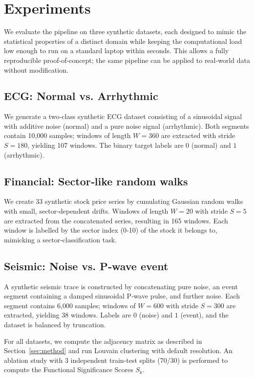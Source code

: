 \section{Experiments}\label{sec:experiments}
We evaluate the pipeline on three synthetic datasets, each designed to mimic the statistical properties of a distinct domain while keeping the computational load low enough to run on a standard laptop within seconds.
This allows a fully reproducible proof‑of‑concept; the same pipeline can be applied to real‑world data without modification.

\subsection{ECG: Normal vs. Arrhythmic}
We generate a two‑class synthetic ECG dataset consisting of a sinusoidal signal with additive noise (normal) and a pure noise signal (arrhythmic).
Both segments contain 10,000 samples; windows of length $W=360$ are extracted with stride $S=180$, yielding 107 windows.
The binary target labels are $0$ (normal) and $1$ (arrhythmic).

\subsection{Financial: Sector‑like random walks}
We create 33 synthetic stock price series by cumulating Gaussian random walks with small, sector‑dependent drifts.
Windows of length $W=20$ with stride $S=5$ are extracted from the concatenated series, resulting in 165 windows.
Each window is labelled by the sector index (0‑10) of the stock it belongs to, mimicking a sector‑classification task.

\subsection{Seismic: Noise vs. P‑wave event}
A synthetic seismic trace is constructed by concatenating pure noise, an event segment containing a damped sinusoidal P‑wave pulse, and further noise.
Each segment contains 6,000 samples; windows of $W=600$ with stride $S=300$ are extracted, yielding 38 windows.
Labels are $0$ (noise) and $1$ (event), and the dataset is balanced by truncation.

For all datasets, we compute the adjacency matrix as described in Section~\ref{sec:method} and run Louvain clustering with default resolution.
An ablation study with 3 independent train‑test splits (70/30) is performed to compute the Functional Significance Scores $S_k$.